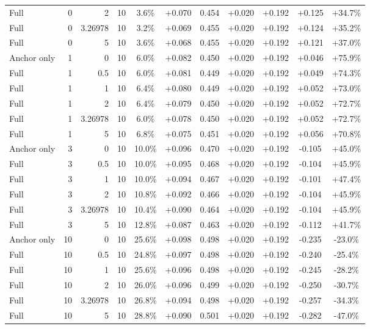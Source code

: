 \begin{table}[htbp]
\begin{tabular}{lrrrccccccc}
Full & 0 & 2 & 10 & 3.6\% & +0.070 & 0.454 & +0.020 & +0.192 & +0.125 & +34.7\% \\
Full & 0 & 3.26978 & 10 & 3.2\% & +0.069 & 0.455 & +0.020 & +0.192 & +0.124 & +35.2\% \\
Full & 0 & 5 & 10 & 3.6\% & +0.068 & 0.455 & +0.020 & +0.192 & +0.121 & +37.0\% \\
Anchor only & 1 & 0 & 10 & 6.0\% & +0.082 & 0.450 & +0.020 & +0.192 & +0.046 & +75.9\% \\
Full & 1 & 0.5 & 10 & 6.0\% & +0.081 & 0.449 & +0.020 & +0.192 & +0.049 & +74.3\% \\
Full & 1 & 1 & 10 & 6.4\% & +0.080 & 0.449 & +0.020 & +0.192 & +0.052 & +73.0\% \\
Full & 1 & 2 & 10 & 6.4\% & +0.079 & 0.450 & +0.020 & +0.192 & +0.052 & +72.7\% \\
Full & 1 & 3.26978 & 10 & 6.0\% & +0.078 & 0.450 & +0.020 & +0.192 & +0.052 & +72.7\% \\
Full & 1 & 5 & 10 & 6.8\% & +0.075 & 0.451 & +0.020 & +0.192 & +0.056 & +70.8\% \\
Anchor only & 3 & 0 & 10 & 10.0\% & +0.096 & 0.470 & +0.020 & +0.192 & -0.105 & +45.0\% \\
Full & 3 & 0.5 & 10 & 10.0\% & +0.095 & 0.468 & +0.020 & +0.192 & -0.104 & +45.9\% \\
Full & 3 & 1 & 10 & 10.0\% & +0.094 & 0.467 & +0.020 & +0.192 & -0.101 & +47.4\% \\
Full & 3 & 2 & 10 & 10.8\% & +0.092 & 0.466 & +0.020 & +0.192 & -0.104 & +45.9\% \\
Full & 3 & 3.26978 & 10 & 10.4\% & +0.090 & 0.464 & +0.020 & +0.192 & -0.104 & +45.9\% \\
Full & 3 & 5 & 10 & 12.8\% & +0.087 & 0.463 & +0.020 & +0.192 & -0.112 & +41.7\% \\
Anchor only & 10 & 0 & 10 & 25.6\% & +0.098 & 0.498 & +0.020 & +0.192 & -0.235 & -23.0\% \\
Full & 10 & 0.5 & 10 & 24.8\% & +0.097 & 0.498 & +0.020 & +0.192 & -0.240 & -25.4\% \\
Full & 10 & 1 & 10 & 25.6\% & +0.096 & 0.498 & +0.020 & +0.192 & -0.245 & -28.2\% \\
Full & 10 & 2 & 10 & 26.0\% & +0.096 & 0.499 & +0.020 & +0.192 & -0.250 & -30.7\% \\
Full & 10 & 3.26978 & 10 & 26.8\% & +0.094 & 0.498 & +0.020 & +0.192 & -0.257 & -34.3\% \\
Full & 10 & 5 & 10 & 28.8\% & +0.090 & 0.501 & +0.020 & +0.192 & -0.282 & -47.0\% \\

\end{tabular}
\end{table}
